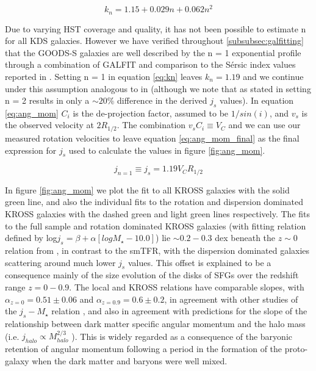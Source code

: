 \documentclass[fleqn,usenatbib]{mn2e}
\newcommand{\Sers}{S\'{e}rsic }
\begin{document}
\begin{equation}\label{eq:kn}
   k_{n} = 1.15 + 0.029n + 0.062n^{2}
\end{equation}

Due to varying HST coverage and quality, it has not been possible to estimate n for all KDS galaxies.
However we have verified throughout \cref{subsubsec:galfitting} that the GOODS-S galaxies are well described by the n = 1 exponential profile through a combination of GALFIT and comparison to the \Sers index values reported in \cite{VanderWel2012}.
Setting n = 1 in equation \ref{eq:kn} leaves $k_{n} = 1.19$ and we continue under this assumption analogous to in \cite{Harrison2017} (although we note that as stated in \cite{Harrison2017} setting n = 2 results in only a $\sim20\%$ difference in the derived $j_{s}$ values).
In equation \ref{eq:ang_mom} $C_{i}$ is the de-projection factor, assumed to be $1/sin(i)$, and $v_{s}$ is the observed velocity at $2R_{1/2}$.
The combination $v_{s}C_{i} \equiv V_{C}$ and we can use our measured rotation velocities to leave equation \ref{eq:ang_mom_final} as the final expression for $j_{s}$ used to calculate the values in figure \ref{fig:ang_mom}. 

\begin{equation}\label{eq:ang_mom_final}
   j_{n=1} \equiv j_{s} = 1.19V_{C}R_{1/2}
\end{equation}

In figure \ref{fig:ang_mom} we plot the fit to all KROSS galaxies with the solid green line, and also the individual fits to the rotation and dispersion dominated KROSS galaxies with the dashed green and light green lines respectively.
The fits to the full sample and rotation dominated KROSS galaxies (with fitting relation defined by log$j_{s} =  \beta + \alpha[logM_{\star} - 10.0]$) lie $\sim0.2-0.3$ dex beneath the $z\sim0$ relation from \cite{Romanowsky2012}, in contrast to the smTFR, with the dispersion dominated galaxies scattering around much lower $j_{s}$ values.
This offset is explained to be a consequence mainly of the size evolution of the disks of SFGs over the redshift range $z=0-0.9$.
The local and KROSS relations have comparable slopes, with $\alpha_{z=0}=0.51\pm0.06$ and $\alpha_{z=0.9}=0.6\pm0.2$, in agreement with other studies of the $j_{s}-M_{\star}$ relation \citep{Cortese2016,Contini2015a,Burkert2016a,Swinbank2017}, and also in agreement with predictions for the slope of the relationship between dark matter specific angular momentum and the halo mass (i.e. $j_{halo} \propto M_{halo}^{2/3}$ \citep[e.g.][]{Barnes1987}).
This is widely regarded as a consequence of the baryonic retention of angular momentum following a period in the formation of the proto-galaxy when the dark matter and baryons were well mixed. \\
\end{document}
